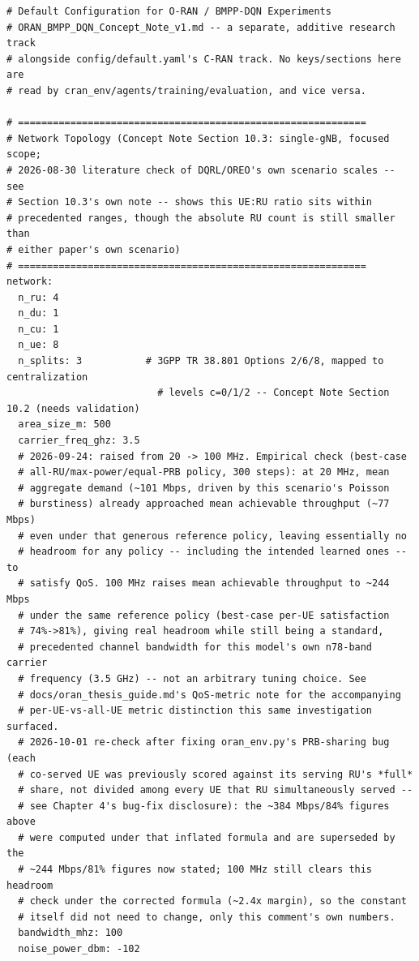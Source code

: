 {\footnotesize
\begin{verbatim}
# Default Configuration for O-RAN / BMPP-DQN Experiments
# ORAN_BMPP_DQN_Concept_Note_v1.md -- a separate, additive research track
# alongside config/default.yaml's C-RAN track. No keys/sections here are
# read by cran_env/agents/training/evaluation, and vice versa.

# ============================================================
# Network Topology (Concept Note Section 10.3: single-gNB, focused scope;
# 2026-08-30 literature check of DQRL/OREO's own scenario scales -- see
# Section 10.3's own note -- shows this UE:RU ratio sits within
# precedented ranges, though the absolute RU count is still smaller than
# either paper's own scenario)
# ============================================================
network:
  n_ru: 4
  n_du: 1
  n_cu: 1
  n_ue: 8
  n_splits: 3           # 3GPP TR 38.801 Options 2/6/8, mapped to centralization
                          # levels c=0/1/2 -- Concept Note Section 10.2 (needs validation)
  area_size_m: 500
  carrier_freq_ghz: 3.5
  # 2026-09-24: raised from 20 -> 100 MHz. Empirical check (best-case
  # all-RU/max-power/equal-PRB policy, 300 steps): at 20 MHz, mean
  # aggregate demand (~101 Mbps, driven by this scenario's Poisson
  # burstiness) already approached mean achievable throughput (~77 Mbps)
  # even under that generous reference policy, leaving essentially no
  # headroom for any policy -- including the intended learned ones -- to
  # satisfy QoS. 100 MHz raises mean achievable throughput to ~244 Mbps
  # under the same reference policy (best-case per-UE satisfaction
  # 74%->81%), giving real headroom while still being a standard,
  # precedented channel bandwidth for this model's own n78-band carrier
  # frequency (3.5 GHz) -- not an arbitrary tuning choice. See
  # docs/oran_thesis_guide.md's QoS-metric note for the accompanying
  # per-UE-vs-all-UE metric distinction this same investigation surfaced.
  # 2026-10-01 re-check after fixing oran_env.py's PRB-sharing bug (each
  # co-served UE was previously scored against its serving RU's *full*
  # share, not divided among every UE that RU simultaneously served --
  # see Chapter 4's bug-fix disclosure): the ~384 Mbps/84% figures above
  # were computed under that inflated formula and are superseded by the
  # ~244 Mbps/81% figures now stated; 100 MHz still clears this headroom
  # check under the corrected formula (~2.4x margin), so the constant
  # itself did not need to change, only this comment's own numbers.
  bandwidth_mhz: 100
  noise_power_dbm: -102


\end{verbatim}}
